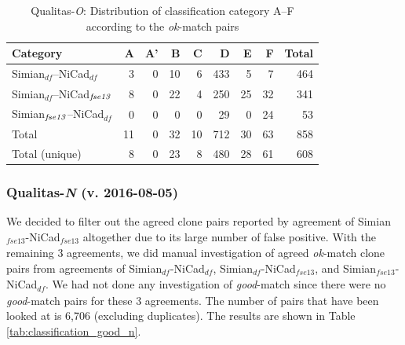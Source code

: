 \documentclass{IEEEtran}
\begin{document}
\begin{table}[H]
	\centering
	\caption{Qualitas-\textit{O}: Distribution of classification category A--F  according to the \textit{ok}-match pairs}
	\label{tab:ok_classification}
	\begin{tabular}{|l|r|r|r|r|r|r|r|r|}
		\hline 
		Category   																										& A   	& 	A' 	& 	B  & C	   & D   	&	E   &	F   & Total  \\
		\hline
		Simian$_{\mathrm{\textit{df}}}$--NiCad$_{\mathrm{\textit{df}}}$        & 3 	& 0 	& 10	& 6 	& 433  & 5	& 7  &  464 \\
		Simian$_{\mathrm{\textit{df}}}$--NiCad$_{\textrm{\textit{fse13}}}$   									& 8 	& 0 	& 22	& 4	& 250 & 25  & 32 &  341 \\
		Simian$_{\textrm{\textit{fse13}}}$--NiCad$_{\mathrm{\textit{df}}}$   									& 0 	& 0 	& 0 	& 0 	 & 29 	  & 0 		& 24 	& 53 \\
		\hline
		Total   &   11  &   0   &  32   &  10   &   712   &   30   & 63  & 858 \\
		Total (unique)  &   8  &   0   &  23   &  8   &  480  &  28  & 61  & 608 \\
		\hline
	\end{tabular} 
\end{table}

\subsubsection{Qualitas-\textit{N} (v. 2016-08-05)}
We decided to filter out the agreed clone pairs reported by agreement of Simian$_{\mathrm{\textit{fse13}}}$-NiCad$_{\mathrm{\textit{fse13}}}$ altogether due to its large number of false positive. With the remaining 3 agreements, we did manual investigation of agreed \textit{ok}-match clone pairs from agreements of Simian$_{\mathrm{\textit{df}}}$-NiCad$_{\mathrm{\textit{df}}}$, Simian$_{\mathrm{\textit{df}}}$-NiCad$_{\mathrm{\textit{fse13}}}$, and Simian$_{\mathrm{\textit{fse13}}}$-NiCad$_{\mathrm{\textit{df}}}$. We had not done any investigation of \textit{good}-match since there were no \textit{good}-match pairs for these 3 agreements. The number of pairs that have been looked at is 6,706 (excluding duplicates). The results are shown in Table \ref{tab:classification_good_n}.
\end{document}
